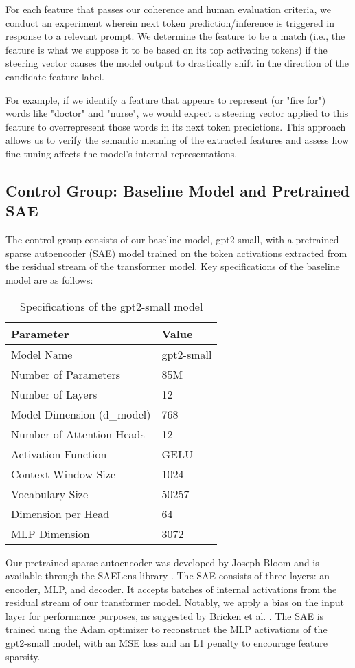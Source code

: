 For each feature that passes our coherence and human evaluation criteria, we conduct an experiment wherein next token prediction/inference is triggered in response to a relevant prompt. We determine the feature to be a match (i.e., the feature is what we suppose it to be based on its top activating tokens) if the steering vector causes the model output to drastically shift in the direction of the candidate feature label.

For example, if we identify a feature that appears to represent (or "fire for") words like "doctor" and "nurse", we would expect a steering vector applied to this feature to overrepresent those words in its next token predictions. This approach allows us to verify the semantic meaning of the extracted features and assess how fine-tuning affects the model's internal representations.

\subsection{Control Group: Baseline Model and Pretrained SAE}

The control group consists of our baseline model, gpt2-small, with a pretrained sparse autoencoder (SAE) model trained on the token activations extracted from the residual stream of the transformer model. Key specifications of the baseline model are as follows:

\begin{table}[h]
\centering
\begin{tabular}{|l|l|}
\hline
Parameter & Value \\
\hline
Model Name & gpt2-small \\
Number of Parameters & 85M \\
Number of Layers & 12 \\
Model Dimension (d\_model) & 768 \\
Number of Attention Heads & 12 \\
Activation Function & GELU \\
Context Window Size & 1024 \\
Vocabulary Size & 50257 \\
Dimension per Head & 64 \\
MLP Dimension & 3072 \\
\hline
\end{tabular}
\caption{Specifications of the gpt2-small model}
\label{tab:gpt2-specs}
\end{table}

Our pretrained sparse autoencoder was developed by Joseph Bloom and is available through the SAELens library \cite{bloom2024saetrainingcodebase}. The SAE consists of three layers: an encoder, MLP, and decoder. It accepts batches of internal activations from the residual stream of our transformer model. Notably, we apply a bias on the input layer for performance purposes, as suggested by Bricken et al. \cite{bricken2023monosemanticity}. The SAE is trained using the Adam optimizer to reconstruct the MLP activations of the gpt2-small model, with an MSE loss and an L1 penalty to encourage feature sparsity.

